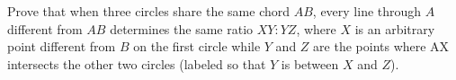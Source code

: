Prove that when three circles share the same chord $AB$,  every line through $A$ different from $AB$ determines the same ratio $X Y : Y Z$,  where $X$ is an arbitrary point different from $B$ on the first circle while $Y$ and $Z$ are the points where AX intersects the other two circles (labeled so that $Y$ is between $X$ and $Z$).
